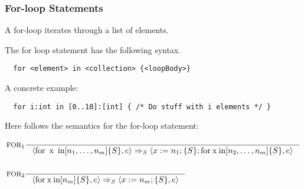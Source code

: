 \subsubsection{For-loop Statements}
\label{subsec:forLoopStatements}

A for-loop iterates through a list of elements.

The for loop statement has the following syntax.

\begin{verbatim}
  for <element> in <collection> {<loopBody>}
\end{verbatim}

A concrete example:

\begin{verbatim}
  for i:int in [0..10]:[int] { /* Do stuff with i elements */ }
\end{verbatim}

Here follows the semantics for the for-loop statement:

\begin{align*}
&\inference[$\text{FOR}_{1}$]{}
                       {\Braket{\Tfor \Tx \Tin [n_1,\dots,n_m]\{S\},e} \Rightarrow_S \Braket{x := n_1;\{S\}; \Tfor \mathbin{\text{x}} \mathbin{\text{in}} [n_2,\dots,n_m]\{S\},e}}
\\\\
&\inference[$\text{FOR}_{2}$]{}
                       {\Braket{\Tfor \mathbin{\text{x}}\mathbin{\text{in}} [n_m]\{S\},e} \Rightarrow_S \Braket{x := n_m;\{S\},e}}
\end{align*}